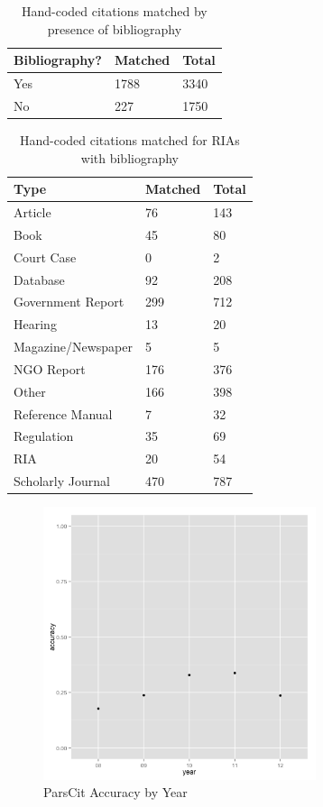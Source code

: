 \documentclass[12pt]{article}
\begin{document}
\begin{table}[ht]
\centering
\caption{Hand-coded citations matched by presence of bibliography}\label{tab:bibmatch}
\begin{tabular}{lll}
  \hline
  \hline
 Bibliography? & Matched & Total\\
 \hline
 Yes & 1788 & 3340\\
 No & 227 & 1750\\
  \hline
  \hline
\end{tabular}
\end{table}

\begin{table}[ht]
\centering
\caption{Hand-coded citations matched for RIAs with bibliography}\label{tab:bibtypes}
\begin{tabular}{lll}
  \hline
  \hline
 Type & Matched & Total\\
 \hline
Article & 76 & 143 \\
Book & 45 & 80\\
Court Case & 0 & 2\\
Database & 92 & 208 \\
Government Report & 299 & 712 \\
Hearing & 13 & 20\\
Magazine/Newspaper & 5 & 5\\
NGO Report & 176 & 376 \\
Other & 166 & 398 \\
Reference Manual & 7 &  32\\
Regulation & 35 & 69 \\
RIA & 20 & 54\\
Scholarly Journal & 470 & 787\\
  \hline
  \hline
\end{tabular}
\end{table}

\begin{figure}
\begin{center}
\includegraphics[height=8cm]{yearly_accuracy.png}
\caption{ParsCit Accuracy by Year}
\label{fig:yearlyaccuracy}
\end{center}
\end{figure}
\end{document}
